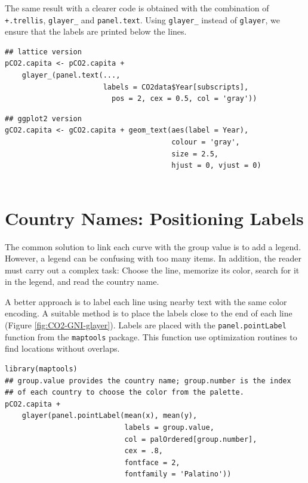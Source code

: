 \documentclass[smallroyalvopaper]{memoir}
\begin{document}
The same result with a clearer code is obtained with the combination
of \texttt{+.trellis}, \texttt{glayer\_} and \texttt{panel.text}. Using \texttt{glayer\_} instead of
\texttt{glayer}, we ensure that the labels are printed below the lines.


\lstset{language=r,label= ,caption= ,captionpos=b,numbers=none}
\begin{lstlisting}
## lattice version
pCO2.capita <- pCO2.capita +
    glayer_(panel.text(...,
                       labels = CO2data$Year[subscripts],
                         pos = 2, cex = 0.5, col = 'gray'))
\end{lstlisting}

\lstset{language=r,label= ,caption= ,captionpos=b,numbers=none}
\begin{lstlisting}
## ggplot2 version
gCO2.capita <- gCO2.capita + geom_text(aes(label = Year),
                                       colour = 'gray',
                                       size = 2.5,
                                       hjust = 0, vjust = 0)
  
\end{lstlisting}

\section{Country Names: Positioning Labels}
\label{sec:org53cce82}
The common solution to link each curve with the group value is to add
a legend. However, a legend can be confusing with too many items. In
addition, the reader must carry out a complex task: Choose the line,
memorize its color, search for it in the legend, and read the country
name.

A better approach is to label each line using nearby text with the
same color encoding. A suitable method is to place the labels
close to the end of each line (Figure
\ref{fig:CO2-GNI-glayer}). Labels are placed with the
\texttt{panel.pointLabel} function from the \texttt{maptools} package. This
function use optimization routines to find locations without
overlaps.


\lstset{language=r,label= ,caption= ,captionpos=b,numbers=none}
\begin{lstlisting}
library(maptools)  
## group.value provides the country name; group.number is the index
## of each country to choose the color from the palette.
pCO2.capita +
    glayer(panel.pointLabel(mean(x), mean(y),
                            labels = group.value,
                            col = palOrdered[group.number],
                            cex = .8,
                            fontface = 2,
                            fontfamily = 'Palatino'))
\end{lstlisting}
\end{document}
